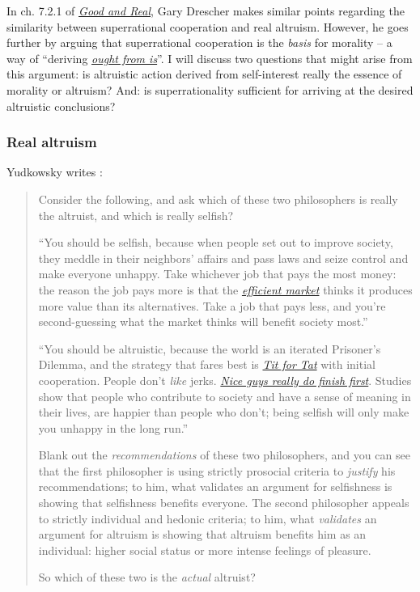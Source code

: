 In ch. 7.2.1 of
\href{https://www.gwern.net/docs/2006-drescher-goodandreal.pdf}{\emph{Good
and Real}}, Gary Drescher makes similar points regarding the similarity
between superrational cooperation and real altruism. However, he goes
further by arguing that superrational cooperation is the \emph{basis}
for morality -- a way of ``deriving
\href{https://en.wikipedia.org/wiki/Is\%E2\%80\%93ought_problem}{\emph{ought
from is}}''. I will discuss two questions that might arise
from this argument: is altruistic action derived from self-interest
really the essence of morality or altruism? And: is superrationality
sufficient for arriving at the desired altruistic conclusions?

\hypertarget{real-altruism}{\subsubsection{Real
altruism}\label{real-altruism}}

Yudkowsky writes \parencite{Yudkowsky2015-tz}:

\begin{quote}
Consider the following, and ask which of these two philosophers is
really the altruist, and which is really selfish?

``You should be selfish, because when people set out to improve society,
they meddle in their neighbors' affairs and pass laws and seize control
and make everyone unhappy. Take whichever job that pays the most money:
the reason the job pays more is that the
\href{https://en.wikipedia.org/wiki/Efficient-market_hypothesis}{\emph{efficient
market}} thinks it produces more value than its alternatives. Take a job
that pays less, and you're second-guessing what the market thinks will
benefit society most.''

``You should be altruistic, because the world is an iterated Prisoner's
Dilemma, and the strategy that fares best is
\href{https://en.wikipedia.org/wiki/Tit_for_tat}{\emph{Tit for Tat}}
with initial cooperation. People don't \emph{like} jerks.
\href{https://en.wikipedia.org/wiki/Nice_Guys_Finish_First}{\emph{Nice
guys really do finish first}}. Studies show that people who contribute
to society and have a sense of meaning in their lives, are happier than
people who don't; being selfish will only make you unhappy in the long
run.''

Blank out the \emph{recommendations} of these two philosophers, and you
can see that the first philosopher is using strictly prosocial criteria
to \emph{justify} his recommendations; to him, what validates an
argument for selfishness is showing that selfishness benefits everyone.
The second philosopher appeals to strictly individual and hedonic
criteria; to him, what \emph{validates} an argument for altruism is
showing that altruism benefits him as an individual: higher social
status or more intense feelings of pleasure.

So which of these two is the \emph{actual} altruist?
\end{quote}

